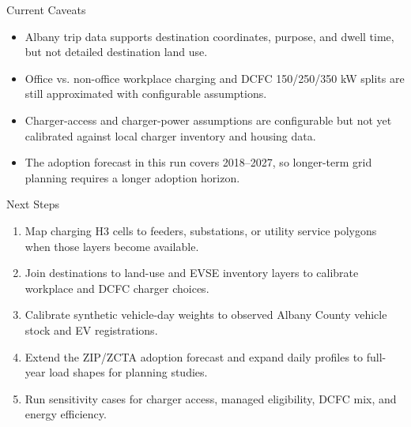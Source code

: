 \documentclass[aspectratio=169]{beamer}
\begin{document}
\begin{frame}{Current Caveats}
\small
\begin{itemize}
  \item Albany trip data supports destination coordinates, purpose, and dwell time, but not detailed destination land use.
  \item Office vs. non-office workplace charging and DCFC 150/250/350 kW splits are still approximated with configurable assumptions.
  \item Charger-access and charger-power assumptions are configurable but not yet calibrated against local charger inventory and housing data.
  \item The adoption forecast in this run covers 2018--2027, so longer-term grid planning requires a longer adoption horizon.
\end{itemize}
\end{frame}

\begin{frame}{Next Steps}
\small
\begin{enumerate}
  \item Map charging H3 cells to feeders, substations, or utility service polygons when those layers become available.
  \item Join destinations to land-use and EVSE inventory layers to calibrate workplace and DCFC charger choices.
  \item Calibrate synthetic vehicle-day weights to observed Albany County vehicle stock and EV registrations.
  \item Extend the ZIP/ZCTA adoption forecast and expand daily profiles to full-year load shapes for planning studies.
  \item Run sensitivity cases for charger access, managed eligibility, DCFC mix, and energy efficiency.
\end{enumerate}
\end{frame}
\end{document}

